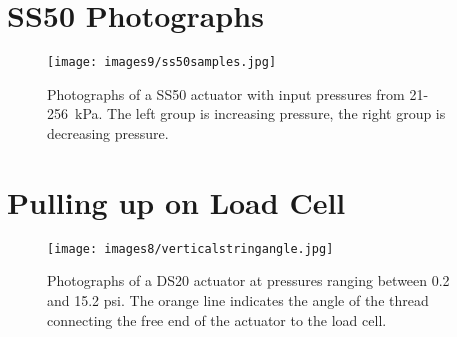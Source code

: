 \chapter{SS50 Photographs}
\label{appendix:s50all}
\begin{figure}[ht]
    \centering
     \texttt{[image: images9/ss50samples.jpg]}
    \caption{Photographs of a SS50 actuator with input pressures from 21-256~kPa. The left group is increasing pressure, the right group is decreasing pressure.}
    \label{fig:ss50samples}
\end{figure}

\chapter{Pulling up on Load Cell}
\label{appendix:pullinguploadcell}

\begin{figure}[ht]
    \centering
     \texttt{[image: images8/verticalstringangle.jpg]}
    \caption{Photographs of a DS20 actuator at pressures ranging between 0.2 and 15.2 psi. The orange line indicates the angle of the thread connecting the free end of the actuator to the load cell.}
    \label{fig:verticalstringangle}
\end{figure}